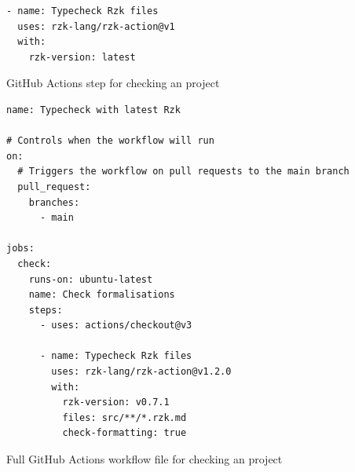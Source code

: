 \begin{listing}
  \begin{verbatim}
- name: Typecheck Rzk files
  uses: rzk-lang/rzk-action@v1
  with:
    rzk-version: latest
  \end{verbatim}
  \caption{GitHub Actions step for checking an \Rzk{} project}
  \label{code:rzk-action-step}
\end{listing}

\begin{listing}
  \begin{verbatim}
name: Typecheck with latest Rzk

# Controls when the workflow will run
on:
  # Triggers the workflow on pull requests to the main branch
  pull_request:
    branches:
      - main

jobs:
  check:
    runs-on: ubuntu-latest
    name: Check formalisations
    steps:
      - uses: actions/checkout@v3

      - name: Typecheck Rzk files
        uses: rzk-lang/rzk-action@v1.2.0
        with:
          rzk-version: v0.7.1
          files: src/**/*.rzk.md
          check-formatting: true
  \end{verbatim}
  \caption{Full GitHub Actions workflow file for checking an \Rzk{} project}
  \label{code:rzk-action-full}
\end{listing}
